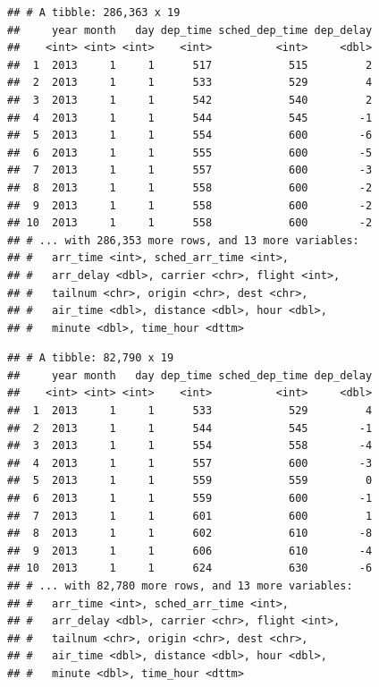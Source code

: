 \documentclass[]{book}
\newenvironment{Shaded}{\begin{snugshade}}{\end{snugshade}}
\newcommand{\KeywordTok}[1]{\textcolor[rgb]{0.13,0.29,0.53}{\textbf{#1}}}
\newcommand{\DecValTok}[1]{\textcolor[rgb]{0.00,0.00,0.81}{#1}}
\newcommand{\CommentTok}[1]{\textcolor[rgb]{0.56,0.35,0.01}{\textit{#1}}}
\newcommand{\OperatorTok}[1]{\textcolor[rgb]{0.81,0.36,0.00}{\textbf{#1}}}
\newcommand{\NormalTok}[1]{#1}
\begin{document}
\begin{verbatim}
## # A tibble: 286,363 x 19
##     year month   day dep_time sched_dep_time dep_delay
##    <int> <int> <int>    <int>          <int>     <dbl>
##  1  2013     1     1      517            515         2
##  2  2013     1     1      533            529         4
##  3  2013     1     1      542            540         2
##  4  2013     1     1      544            545        -1
##  5  2013     1     1      554            600        -6
##  6  2013     1     1      555            600        -5
##  7  2013     1     1      557            600        -3
##  8  2013     1     1      558            600        -2
##  9  2013     1     1      558            600        -2
## 10  2013     1     1      558            600        -2
## # ... with 286,353 more rows, and 13 more variables:
## #   arr_time <int>, sched_arr_time <int>,
## #   arr_delay <dbl>, carrier <chr>, flight <int>,
## #   tailnum <chr>, origin <chr>, dest <chr>,
## #   air_time <dbl>, distance <dbl>, hour <dbl>,
## #   minute <dbl>, time_hour <dttm>
\end{verbatim}

\begin{Shaded}
\end{Shaded}

\begin{verbatim}
## # A tibble: 82,790 x 19
##     year month   day dep_time sched_dep_time dep_delay
##    <int> <int> <int>    <int>          <int>     <dbl>
##  1  2013     1     1      533            529         4
##  2  2013     1     1      544            545        -1
##  3  2013     1     1      554            558        -4
##  4  2013     1     1      557            600        -3
##  5  2013     1     1      559            559         0
##  6  2013     1     1      559            600        -1
##  7  2013     1     1      601            600         1
##  8  2013     1     1      602            610        -8
##  9  2013     1     1      606            610        -4
## 10  2013     1     1      624            630        -6
## # ... with 82,780 more rows, and 13 more variables:
## #   arr_time <int>, sched_arr_time <int>,
## #   arr_delay <dbl>, carrier <chr>, flight <int>,
## #   tailnum <chr>, origin <chr>, dest <chr>,
## #   air_time <dbl>, distance <dbl>, hour <dbl>,
## #   minute <dbl>, time_hour <dttm>
\end{verbatim}
\end{document}

